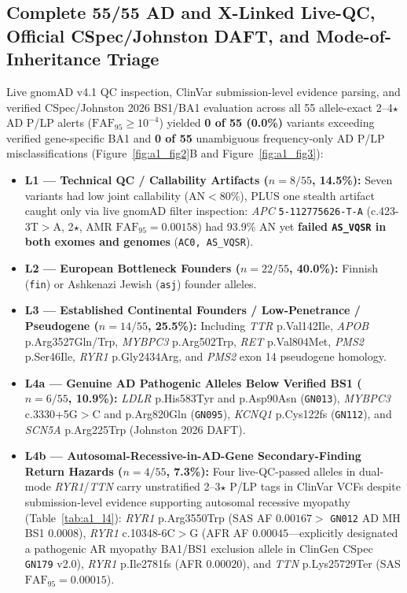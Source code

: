 \documentclass[11pt,letterpaper]{article}
\begin{document}
\subsection{Complete 55/55 AD and X-Linked Live-QC, Official CSpec/Johnston DAFT, and Mode-of-Inheritance Triage}
Live gnomAD v4.1 QC inspection, ClinVar submission-level evidence parsing, and verified CSpec/Johnston 2026 BS1/BA1 evaluation across all 55 allele-exact 2--4$\star$ AD P/LP alerts ($\mathrm{FAF}_{95}\ge 10^{-4}$) yielded \textbf{0 of 55 (0.0\%)} variants exceeding verified gene-specific BA1 and \textbf{0 of 55} unambiguous frequency-only AD P/LP misclassifications (Figure~\ref{fig:a1_fig2}B and Figure~\ref{fig:a1_fig3}):
\begin{itemize}
  \item \textbf{L1 --- Technical QC / Callability Artifacts ($n=8/55$, 14.5\%):} Seven variants had low joint callability ($\mathrm{AN}<80\%$), PLUS one stealth artifact caught only via live gnomAD filter inspection: \textit{APC} \texttt{5-112775626-T-A} (c.423-3T$>$A, 2$\star$, AMR $\mathrm{FAF}_{95}=0.00158$) had 93.9\% AN yet \textbf{failed \texttt{AS\_VQSR} in both exomes and genomes} (\texttt{AC0, AS\_VQSR}).
  \item \textbf{L2 --- European Bottleneck Founders ($n=22/55$, 40.0\%):} Finnish (\texttt{fin}) or Ashkenazi Jewish (\texttt{asj}) founder alleles.
  \item \textbf{L3 --- Established Continental Founders / Low-Penetrance / Pseudogene ($n=14/55$, 25.5\%):} Including \textit{TTR} p.Val142Ile, \textit{APOB} p.Arg3527Gln/Trp, \textit{MYBPC3} p.Arg502Trp, \textit{RET} p.Val804Met, \textit{PMS2} p.Ser46Ile, \textit{RYR1} p.Gly2434Arg, and \textit{PMS2} exon 14 pseudogene homology.
  \item \textbf{L4a --- Genuine AD Pathogenic Alleles Below Verified BS1 ($n=6/55$, 10.9\%):} \textit{LDLR} p.His583Tyr and p.Asp90Asn (\texttt{GN013}), \textit{MYBPC3} c.3330+5G$>$C and p.Arg820Gln (\texttt{GN095}), \textit{KCNQ1} p.Cys122fs (\texttt{GN112}), and \textit{SCN5A} p.Arg225Trp (Johnston 2026 DAFT).
  \item \textbf{L4b --- Autosomal-Recessive-in-AD-Gene Secondary-Finding Return Hazards ($n=4/55$, 7.3\%):} Four live-QC-passed alleles in dual-mode \textit{RYR1}/\textit{TTN} carry unstratified 2--3$\star$ P/LP tags in ClinVar VCFs despite submission-level evidence supporting autosomal recessive myopathy (Table~\ref{tab:a1_l4}): \textit{RYR1} p.Arg3550Trp (SAS AF $0.00167 >$ \texttt{GN012} AD MH BS1 $0.0008$), \textit{RYR1} c.10348-6C$>$G (AFR AF $0.00045$---explicitly designated a pathogenic AR myopathy BA1/BS1 exclusion allele in ClinGen CSpec \texttt{GN179} v2.0), \textit{RYR1} p.Ile2781fs (AFR $0.00020$), and \textit{TTN} p.Lys25729Ter (SAS $\mathrm{FAF}_{95}=0.00015$).

\end{itemize}
\end{document}
